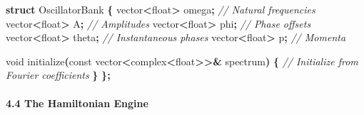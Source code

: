 \documentclass[
  11pt,
  a4paper,
]{article}
\newenvironment{Shaded}{\begin{snugshade}}{\end{snugshade}}
\newcommand{\AttributeTok}[1]{\textcolor[rgb]{0.13,0.29,0.53}{#1}}
\newcommand{\CommentTok}[1]{\textcolor[rgb]{0.56,0.35,0.01}{\textit{#1}}}
\newcommand{\DataTypeTok}[1]{\textcolor[rgb]{0.13,0.29,0.53}{#1}}
\newcommand{\KeywordTok}[1]{\textcolor[rgb]{0.13,0.29,0.53}{\textbf{#1}}}
\newcommand{\NormalTok}[1]{#1}
\newcommand{\OperatorTok}[1]{\textcolor[rgb]{0.81,0.36,0.00}{\textbf{#1}}}
\begin{document}
\begin{Shaded}
\begin{Highlighting}[]
\KeywordTok{struct}\NormalTok{ OscillatorBank }\OperatorTok{\{}
\NormalTok{    vector}\OperatorTok{\textless{}}\DataTypeTok{float}\OperatorTok{\textgreater{}}\NormalTok{ omega}\OperatorTok{;}   \CommentTok{// Natural frequencies}
\NormalTok{    vector}\OperatorTok{\textless{}}\DataTypeTok{float}\OperatorTok{\textgreater{}}\NormalTok{ A}\OperatorTok{;}       \CommentTok{// Amplitudes}
\NormalTok{    vector}\OperatorTok{\textless{}}\DataTypeTok{float}\OperatorTok{\textgreater{}}\NormalTok{ phi}\OperatorTok{;}     \CommentTok{// Phase offsets}
\NormalTok{    vector}\OperatorTok{\textless{}}\DataTypeTok{float}\OperatorTok{\textgreater{}}\NormalTok{ theta}\OperatorTok{;}   \CommentTok{// Instantaneous phases}
\NormalTok{    vector}\OperatorTok{\textless{}}\DataTypeTok{float}\OperatorTok{\textgreater{}}\NormalTok{ p}\OperatorTok{;}       \CommentTok{// Momenta}
    
    \DataTypeTok{void}\NormalTok{ initialize}\OperatorTok{(}\AttributeTok{const}\NormalTok{ vector}\OperatorTok{\textless{}}\NormalTok{complex}\OperatorTok{\textless{}}\DataTypeTok{float}\OperatorTok{\textgreater{}\textgreater{}\&}\NormalTok{ spectrum}\OperatorTok{)} \OperatorTok{\{}
        \CommentTok{// Initialize from Fourier coefficients}
    \OperatorTok{\}}
\OperatorTok{\};}
\end{Highlighting}
\end{Shaded}

\paragraph{4.4 The Hamiltonian Engine}\label{the-hamiltonian-engine}
\end{document}
